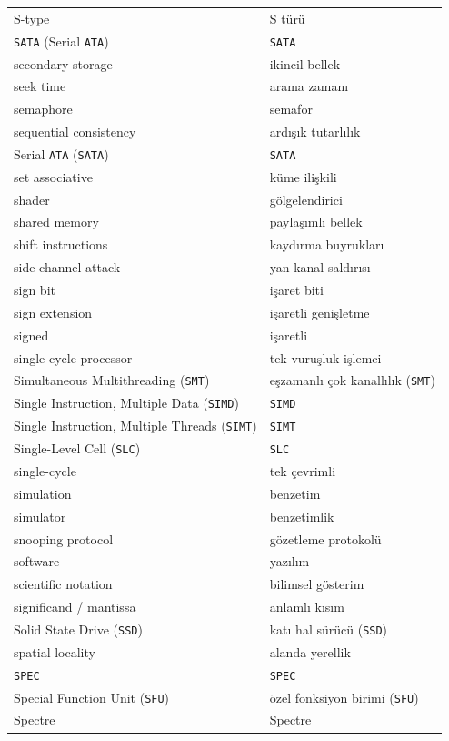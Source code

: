 {\begin{longtable}{@{}p{7.6cm}p{7.6cm}@{}}
S-type & S türü \\
\texttt{SATA} (Serial \texttt{ATA}) & \texttt{SATA} \\
secondary storage & ikincil bellek \\
seek time & arama zamanı \\
semaphore & semafor \\
sequential consistency & ardışık tutarlılık \\
Serial \texttt{ATA} (\texttt{SATA}) & \texttt{SATA} \\
set associative & küme ilişkili \\
shader & gölgelendirici \\
shared memory & paylaşımlı bellek \\
shift instructions & kaydırma buyrukları \\
side-channel attack & yan kanal saldırısı \\
sign bit & işaret biti \\
sign extension & işaretli genişletme \\
signed & işaretli \\
single-cycle processor & tek vuruşluk işlemci \\
Simultaneous Multithreading (\texttt{SMT}) & eşzamanlı çok kanallılık (\texttt{SMT}) \\
Single Instruction, Multiple Data (\texttt{SIMD}) & \texttt{SIMD} \\
Single Instruction, Multiple Threads (\texttt{SIMT}) & \texttt{SIMT} \\
Single-Level Cell (\texttt{SLC}) & \texttt{SLC} \\
single-cycle & tek çevrimli \\
simulation & benzetim \\
simulator & benzetimlik \\
snooping protocol & gözetleme protokolü \\
software & yazılım \\
scientific notation & bilimsel gösterim \\
significand / mantissa & anlamlı kısım \\
Solid State Drive (\texttt{SSD}) & katı hal sürücü (\texttt{SSD}) \\
spatial locality & alanda yerellik \\
\texttt{SPEC} & \texttt{SPEC} \\
Special Function Unit (\texttt{SFU}) & özel fonksiyon birimi (\texttt{SFU}) \\
Spectre & Spectre \\

\end{longtable}}
